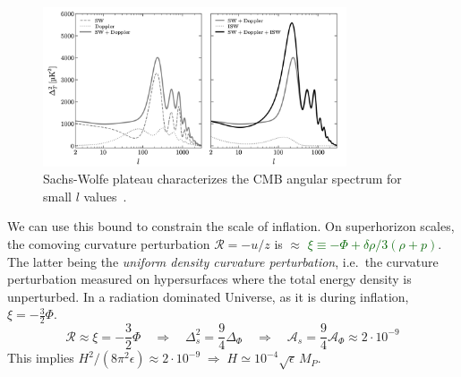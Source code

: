 \begin{figure}[h]
      \centering
        \includegraphics[width=0.8\textwidth]{Graphics/CMB.png}
        \caption{Sachs-Wolfe plateau characterizes the CMB angular spectrum for small $l$ values~\cite{CosmologyBau}.}
  \end{figure}

We can use this bound to constrain the scale of inflation. On superhorizon scales, the comoving curvature perturbation $\mathcal{R}=-u/z$ is $\approx$ \textcolor{darkgreen}{$\mathcal{\xi} \equiv -\Phi + \delta \rho /3(\rho+p)$}. The latter being the \textit{uniform density curvature perturbation}, i.e.\ the curvature perturbation measured on hypersurfaces where the total energy density is unperturbed.
In a radiation dominated Universe, as it is during inflation, $\xi= -\frac{3}{2}\Phi$.  
\begin{equation}
    \mathcal{R} \approx \mathcal{\xi}= -\frac{3}{2}\Phi \quad \Rightarrow \quad \Delta^2_{s} = \frac{9}{4} \Delta_{\Phi} \quad \Rightarrow \quad \mathcal{A}_{s} = \frac{9}{4}  \mathcal{A}_\Phi \approx 2\cdot 10^{-9}
\end{equation}
This implies $H^2/(8\pi^2 \epsilon)\approx 2\cdot 10^{-9} \;\Rightarrow\; H\simeq 10^{-4} \sqrt{\epsilon} \,M_P$.